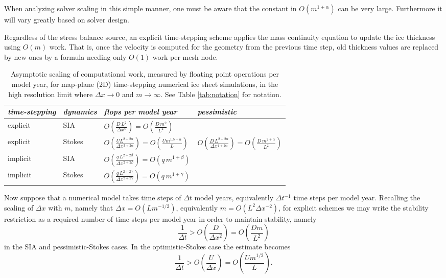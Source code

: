 \documentclass[twocolumn,letterpaper]{igs}
\begin{document}
When analyzing solver scaling in this simple manner, one must be aware that the constant in $O(m^{1+\alpha})$ can be very large.  Furthermore it will vary greatly based on solver design.

Regardless of the stress balance source, an explicit time-stepping scheme applies the mass continuity equation to update the ice thickness using $O(m)$ work.  That is, once the velocity is computed for the geometry from the previous time step, old thickness values are replaced by new ones by a formula needing only $O(1)$ work per mesh node.

\newcommand{\oo}[1]{\displaystyle O\left(#1\right)}
\setlength{\tabcolsep}{5pt}
\renewcommand{\arraystretch}{1.5}
\begin{table*}[ht]
{\normalsize
\begin{tabular}{llll}
\emph{time-stepping} & \emph{dynamics} & \emph{flops per model year} & \emph{pessimistic} \\ \hline
explicit & SIA    & $\oo{\frac{D\, L^2}{\Delta x^4}} = \oo{\frac{D\, m^2}{L^2}}${\Huge \strut} \\
explicit & Stokes & $\oo{\frac{U L^{2+2\alpha}}{\Delta x^{3+2\alpha}}} = \oo{\frac{U m^{1.5+\alpha}}{L}}${\Huge \strut}\phantom{x} & $\oo{\frac{D\, L^{2+2\alpha}}{\Delta x^{4+2\alpha}}} = \oo{\frac{D\,m^{2+\alpha}}{L^2}}$ \\
implicit & SIA    & $\oo{\frac{q\, L^{2+2\beta}}{\Delta x^{2+2\beta}}} = \oo{q\, m^{1+\beta}}${\Huge \strut} \\
implicit & Stokes & $\oo{\frac{q\, L^{2+2\gamma}}{\Delta x^{2+2\gamma}}} = \oo{q\, m^{1+\gamma}}${\Huge \strut}
\end{tabular}
}
\caption{Asymptotic scaling of computational work, measured by floating point operations per model year, for map-plane (2D) time-stepping numerical ice sheet simulations, in the high resolution limit where $\Delta x\to 0$ and $m\to\infty$.  See Table \ref{tab:notation} for notation.}
\label{tab:performancemodel}
\end{table*}

Now suppose that a numerical model takes time steps of $\Delta t$ model years, equivalently $\Delta t^{-1}$ time steps per model year.  Recalling the scaling of $\Delta x$ with $m$, namely that $\Delta x = O(L m^{-1/2})$, equivalently $m=O(L^2 \Delta x^{-2})$, for explicit schemes we may write the stability restriction as a required number of time-steps per model year in order to maintain stability, namely
\begin{equation}
\frac{1}{\Delta t} > \oo{\frac{D}{\Delta x^2}} = \oo{\frac{D m}{L^2}} \label{eq:explicitsiarequired}
\end{equation}
in the SIA and pessimistic-Stokes cases.  In the optimistic-Stokes case the estimate becomes
\begin{equation}
\frac{1}{\Delta t} > \oo{\frac{U}{\Delta x}} = \oo{\frac{U m^{1/2}}{L}}. \label{eq:explicitoptstokesrequired}
\end{equation}
\end{document}

